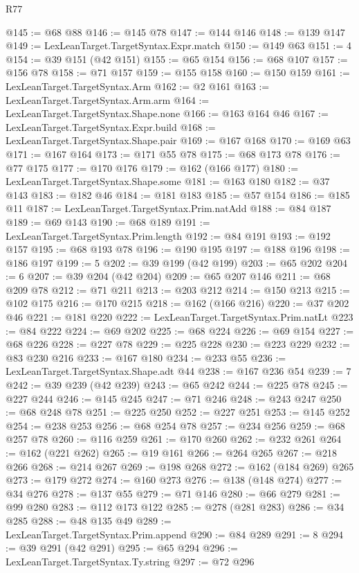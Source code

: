 \begin{lexlean}{R77}
\begin{coremodule}
@145 := @68 @88
@146 := @145 @78
@147 := @144 @146
@148 := @139 @147
@149 := LexLeanTarget.TargetSyntax.Expr.match
@150 := @149 @63
@151 := 4
@154 := @39 @151 (@42 @151)
@155 := @65 @154
@156 := @68 @107
@157 := @156 @78
@158 := @71 @157
@159 := @155 @158
@160 := @150 @159
@161 := LexLeanTarget.TargetSyntax.Arm
@162 := @2 @161
@163 := LexLeanTarget.TargetSyntax.Arm.arm
@164 := LexLeanTarget.TargetSyntax.Shape.none
@166 := @163 @164 @46
@167 := LexLeanTarget.TargetSyntax.Expr.build
@168 := LexLeanTarget.TargetSyntax.Shape.pair
@169 := @167 @168
@170 := @169 @63
@171 := @167 @164
@173 := @171 @55 @78
@175 := @68 @173 @78
@176 := @77 @175
@177 := @170 @176
@179 := @162 (@166 @177)
@180 := LexLeanTarget.TargetSyntax.Shape.some
@181 := @163 @180
@182 := @37 @143
@183 := @182 @46
@184 := @181 @183
@185 := @57 @154
@186 := @185 @11
@187 := LexLeanTarget.TargetSyntax.Prim.natAdd
@188 := @84 @187
@189 := @69 @143
@190 := @68 @189
@191 := LexLeanTarget.TargetSyntax.Prim.length
@192 := @84 @191
@193 := @192 @157
@195 := @68 @193 @78
@196 := @190 @195
@197 := @188 @196
@198 := @186 @197
@199 := 5
@202 := @39 @199 (@42 @199)
@203 := @65 @202
@204 := 6
@207 := @39 @204 (@42 @204)
@209 := @65 @207 @146
@211 := @68 @209 @78
@212 := @71 @211
@213 := @203 @212
@214 := @150 @213
@215 := @102 @175
@216 := @170 @215
@218 := @162 (@166 @216)
@220 := @37 @202 @46
@221 := @181 @220
@222 := LexLeanTarget.TargetSyntax.Prim.natLt
@223 := @84 @222
@224 := @69 @202
@225 := @68 @224
@226 := @69 @154
@227 := @68 @226
@228 := @227 @78
@229 := @225 @228
@230 := @223 @229
@232 := @83 @230 @216
@233 := @167 @180
@234 := @233 @55
@236 := LexLeanTarget.TargetSyntax.Shape.adt @44
@238 := @167 @236 @54
@239 := 7
@242 := @39 @239 (@42 @239)
@243 := @65 @242
@244 := @225 @78
@245 := @227 @244
@246 := @145 @245
@247 := @71 @246
@248 := @243 @247
@250 := @68 @248 @78
@251 := @225 @250
@252 := @227 @251
@253 := @145 @252
@254 := @238 @253
@256 := @68 @254 @78
@257 := @234 @256
@259 := @68 @257 @78
@260 := @116 @259
@261 := @170 @260
@262 := @232 @261
@264 := @162 (@221 @262)
@265 := @19 @161
@266 := @264 @265
@267 := @218 @266
@268 := @214 @267
@269 := @198 @268
@272 := @162 (@184 @269) @265
@273 := @179 @272
@274 := @160 @273
@276 := @138 (@148 @274)
@277 := @34 @276
@278 := @137 @55
@279 := @71 @146
@280 := @66 @279
@281 := @99 @280
@283 := @112 @173 @122
@285 := @278 (@281 @283)
@286 := @34 @285
@288 := @48 @135 @49
@289 := LexLeanTarget.TargetSyntax.Prim.append
@290 := @84 @289
@291 := 8
@294 := @39 @291 (@42 @291)
@295 := @65 @294
@296 := LexLeanTarget.TargetSyntax.Ty.string
@297 := @72 @296

\end{coremodule}
\end{lexlean}
